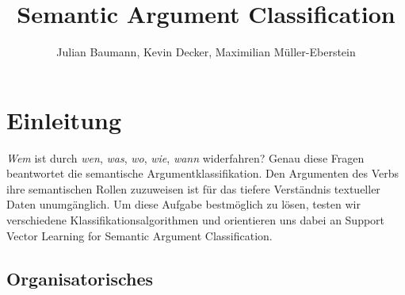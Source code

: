 \documentclass[runningheads]{llncs}
\begin{document}
\lstset{language=Python}

\title{Semantic Argument Classification}

\author{Julian Baumann, Kevin Decker, Maximilian M\"uller-Eberstein}


\maketitle

\section{Einleitung}
\textit{Wem} ist durch \textit{wen}, \textit{was}, \textit{wo}, \textit{wie}, \textit{wann} widerfahren? Genau diese Fragen beantwortet die semantische Argumentklassifikation. Den Argumenten des Verbs ihre semantischen Rollen zuzuweisen ist f\"ur das tiefere Verst\"andnis textueller Daten unumg\"anglich. Um diese Aufgabe bestm\"oglich zu l\"osen, testen wir verschiedene Klassifikationsalgorithmen und orientieren uns dabei an Support Vector Learning for Semantic Argument Classiﬁcation\cite{svm}.
\subsection{Organisatorisches}
\begin{gantt}{13}{10}
    \begin{ganttitle}
    \end{ganttitle}
    \begin{ganttitle}
    \end{ganttitle}
\end{gantt}
\end{document}

